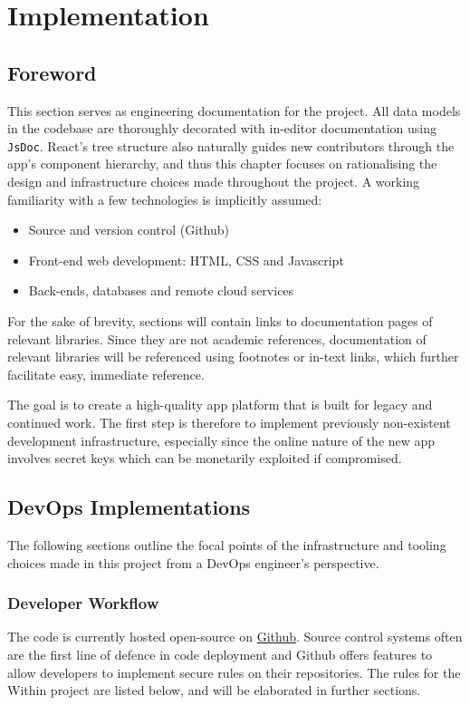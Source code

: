 \chapter{Implementation}
\section{Foreword}
This section serves as engineering documentation for the project. All data models in the codebase are thoroughly decorated with in-editor documentation using \texttt{JsDoc}. React's tree structure also naturally guides new contributors through the app's component hierarchy, and thus this chapter focuses on rationalising the design and infrastructure choices made throughout the project. A working familiarity with a few technologies is implicitly assumed:

\begin{itemize}
    \item Source and version control (Github)
    \item Front-end web development: HTML, CSS and Javascript
    \item Back-ends, databases and remote cloud services
\end{itemize}

For the sake of brevity, sections will contain links to documentation pages of relevant libraries. Since they are not academic references, documentation of relevant libraries will be referenced using footnotes or in-text links, which further facilitate easy, immediate reference.

The goal is to create a high-quality app platform that is built for legacy and continued work. The first step is therefore to implement previously non-existent development infrastructure, especially since the online nature of the new app involves secret keys which can be monetarily exploited if compromised.


\section{DevOps Implementations}
The following sections outline the focal points of the infrastructure and tooling choices made in this project from a DevOps engineer's perspective.


\subsection{Developer Workflow}
The code is currently hosted open-source on \href{https://github.com/Darrekt/within-react-native}{Github}. Source control systems often are the first line of defence in code deployment and Github offers features to allow developers to implement secure rules on their repositories. The rules for the Within project are listed below, and will be elaborated in further sections.

